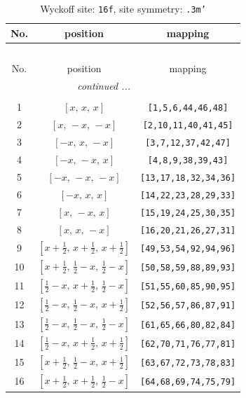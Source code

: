 \documentclass[fleqn,8pt]{jsarticle}
\begin{document}
\begin{longtable}{ccc}
\caption{Wyckoff site: {\tt 16f}, site symmetry: {\tt .3m'}}
 \\
 \hline \hline
No. & position & mapping \\ \hline \endfirsthead

\multicolumn{2}{l}{\tablename\ \thetable{}} \\
 \hline \hline
No. & position & mapping \\ \hline \endhead

 \hline \hline
\multicolumn{2}{r}{\footnotesize\it continued ...} \\ \endfoot

 \hline \hline
\multicolumn{2}{r}{} \\ \endlastfoot

1 & $\left[ x,\, x,\, x \right]$ & {\tt [1,5,6,44,46,48]} \\ \hline
2 & $\left[ x,\, - x,\, - x \right]$ & {\tt [2,10,11,40,41,45]} \\ \hline
3 & $\left[ - x,\, x,\, - x \right]$ & {\tt [3,7,12,37,42,47]} \\ \hline
4 & $\left[ - x,\, - x,\, x \right]$ & {\tt [4,8,9,38,39,43]} \\ \hline
5 & $\left[ - x,\, - x,\, - x \right]$ & {\tt [13,17,18,32,34,36]} \\ \hline
6 & $\left[ - x,\, x,\, x \right]$ & {\tt [14,22,23,28,29,33]} \\ \hline
7 & $\left[ x,\, - x,\, x \right]$ & {\tt [15,19,24,25,30,35]} \\ \hline
8 & $\left[ x,\, x,\, - x \right]$ & {\tt [16,20,21,26,27,31]} \\ \hline
9 & $\left[ x + \frac{1}{2},\, x + \frac{1}{2},\, x + \frac{1}{2} \right]$ & {\tt [49,53,54,92,94,96]} \\ \hline
10 & $\left[ x + \frac{1}{2},\, \frac{1}{2} - x,\, \frac{1}{2} - x \right]$ & {\tt [50,58,59,88,89,93]} \\ \hline
11 & $\left[ \frac{1}{2} - x,\, x + \frac{1}{2},\, \frac{1}{2} - x \right]$ & {\tt [51,55,60,85,90,95]} \\ \hline
12 & $\left[ \frac{1}{2} - x,\, \frac{1}{2} - x,\, x + \frac{1}{2} \right]$ & {\tt [52,56,57,86,87,91]} \\ \hline
13 & $\left[ \frac{1}{2} - x,\, \frac{1}{2} - x,\, \frac{1}{2} - x \right]$ & {\tt [61,65,66,80,82,84]} \\ \hline
14 & $\left[ \frac{1}{2} - x,\, x + \frac{1}{2},\, x + \frac{1}{2} \right]$ & {\tt [62,70,71,76,77,81]} \\ \hline
15 & $\left[ x + \frac{1}{2},\, \frac{1}{2} - x,\, x + \frac{1}{2} \right]$ & {\tt [63,67,72,73,78,83]} \\ \hline
16 & $\left[ x + \frac{1}{2},\, x + \frac{1}{2},\, \frac{1}{2} - x \right]$ & {\tt [64,68,69,74,75,79]} \\
\end{longtable}
\end{document}
